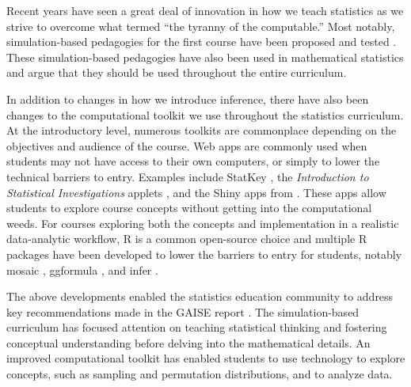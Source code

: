 \documentclass[12pt]{article}
\begin{document}
Recent years have seen a great deal of innovation in how we teach
statistics as we strive to overcome what \citet{Cobb-2007uo} termed
``the tyranny of the computable.'' Most notably, simulation-based
pedagogies for the first course have been proposed and tested
\citep{Cobb-2007uo, Tintle-2011vo, Tintle-2012td, Maurer-2014te, Tintle2014-vt, Hildreth2018}.
These simulation-based pedagogies have also been used in mathematical
statistics \citep{chihara2011, Cobb2011-vz} and \citet{Tintle2015-yv}
argue that they should be used throughout the entire curriculum.

In addition to changes in how we introduce inference, there have also
been changes to the computational toolkit we use throughout the
statistics curriculum. At the introductory level, numerous toolkits are
commonplace depending on the objectives and audience of the course. Web
apps are commonly used when students may not have access to their own
computers, or simply to lower the technical barriers to entry. Examples
include StatKey \citep{Lock2017}, the \emph{Introduction to Statistical
Investigations} applets \citep{tintle2015}, and the Shiny apps from
\citet{agresti2017}. These apps allow students to explore course
concepts without getting into the computational weeds. For courses
exploring both the concepts and implementation in a realistic
data-analytic workflow, R \citep{r} is a common open-source choice and
multiple R packages have been developed to lower the barriers to entry
for students, notably mosaic \citep{Pruim2017-uc}, ggformula
\citep{ggformula}, and infer \citep{infer}.

The above developments enabled the statistics education community to
address key recommendations made in the GAISE report \citep{gaise2016}.
The simulation-based curriculum has focused attention on teaching
statistical thinking and fostering conceptual understanding before
delving into the mathematical details. An improved computational toolkit
has enabled students to use technology to explore concepts, such as
sampling and permutation distributions, and to analyze data.
\end{document}
